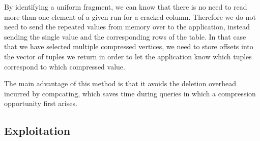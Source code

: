 By identifying a uniform fragment, we can know that there is no need to read more than one element
of a given run for a cracked column. Therefore we do not need to send the repeated values from
memory over to the application, instead sending the single value and the corresponding rows of the
table. In that case that we have selected multiple compressed vertices, we need to store offsets
into the vector of tuples we return in order to let the application know which tuples correspond to
which compressed value.

The main advantage of this method is that it avoids the deletion overhead incurred by compcating,
which saves time during queries in which a compression opportunity first arises.

\subsection{Exploitation}
\label{ss:compressionexploitation}
